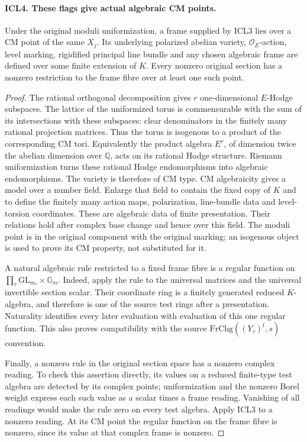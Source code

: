 \paragraph{ICL4. These flags give actual algebraic CM points.}
\label{claim:ICL4}
Under the original moduli uniformization, a frame supplied by
ICL3 lies over a CM point of the same \(X_j\).  Its underlying
polarized abelian variety, \(\mathcal O_E\)-action, level marking,
rigidified principal line bundle and any chosen algebraic frame
are defined over some finite extension of \(K\).  Every nonzero
original section has a nonzero restriction to the frame fibre
over at least one such point.
\begin{proof}
The rational orthogonal decomposition gives \(r\) one-dimensional
\(E\)-Hodge subspaces.  The lattice of the uniformized torus is
commensurable with the sum of its intersections with these
subspaces: clear denominators in the finitely many rational
projection matrices.  Thus the torus is isogenous to a product
of the corresponding CM tori.  Equivalently the product algebra
\(E^r\), of dimension twice the abelian dimension over
\(\mathbb Q\), acts on its rational Hodge structure.  Riemann
uniformization turns these rational Hodge endomorphisms into
algebraic endomorphisms.  The variety is therefore of CM type.
CM algebraicity gives a model over a number field.  Enlarge that
field to contain the fixed copy of \(K\) and to define the
finitely many action maps, polarization, line-bundle data and
level-torsion coordinates.  These are algebraic data of finite
presentation.  Their relations hold after complex base change
and hence over this field.  The moduli point is in the original
component with the original marking; an isogenous object is
used to prove its CM property, not substituted for it.

A natural algebraic rule restricted to a fixed frame fibre is a
regular function on
\(\prod_\tau\mathrm{GL}_{m_\tau}\times\mathbb G_m\).
Indeed, apply the rule to the universal matrices and the
universal invertible section scalar.  Their coordinate ring is
a finitely generated reduced \(K\)-algebra, and therefore is
one of the source test rings after a presentation.  Naturality
identifies every later evaluation with evaluation of this one
regular function.  This also proves compatibility with the
source \(\mathrm{FrChg}((Y_\tau)^t,s)\) convention.

Finally, a nonzero rule in the original section space has a
nonzero complex reading.  To check this assertion directly,
its values on a reduced finite-type test algebra are detected
by its complex points; uniformization and the nonzero Borel
weight express each such value as a scalar times a frame
reading.  Vanishing of all readings would make the rule zero
on every test algebra.  Apply ICL3 to a nonzero reading.  At its
CM point the regular function on the frame fibre is nonzero,
since its value at that complex frame is nonzero.
\end{proof}

